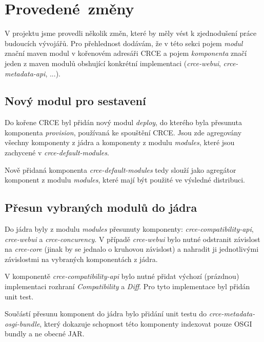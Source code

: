 \documentclass[12pt, a4paper]{article}
\begin{document}
\section{Provedené~změny} %

V projektu jsme provedli několik změn, které by měly vést k zjednodušení práce budoucích vývojářů. Pro přehlednost dodávám, že v této sekci pojem \textit{modul} znační maven modul v kořenovém adresáři CRCE a pojem \textit{komponenta} značí jeden z maven modulů obshující konkrétní implementaci (\textit{crce-webui}, \textit{crce-metadata-api}, ...).

\subsection{Nový modul pro sestavení}
Do kořene CRCE byl přidán nový modul \textit{deploy}, do kterého byla přesunuta komponenta \textit{provision}, používaná ke spouštění CRCE. Jsou zde agregovány všechny komponenty z jádra a komponenty z modulu \textit{modules}, které jsou zachycené v \textit{crce-default-modules}. 

Nově přidaná komponenta \textit{crce-default-modules} tedy slouží jako agregátor komponent z modulu \textit{modules}, které mají být použité ve výsledné distribuci.

\subsection{Přesun vybraných modulů do jádra}
Do jádra byly z modulu \textit{modules} přesunuty komponenty: \textit{crce-compatibility-api}, \textit{crce-webui} a \textit{crce-concurency}. V případě \textit{crce-webui} bylo nutné odstranit závislost na \textit{crce-core} (jinak by se jednalo o kruhovou závislost) a nahradit ji jednotlivými závislostmi na vybraných komponentách z jádra.

V komponentě \textit{crce-compatibility-api} bylo nutné přidat výchozí (prázdnou) implementaci rozhraní \textit{Compatibility} a \textit{Diff}. Pro tyto implementace byl přidán unit test.

Součástí přesunu komponent do jádra bylo přidání unit testu do \textit{crce-metadata-osgi-bundle}, který dokazuje schopnost této komponenty indexovat pouze OSGI bundly a ne obecné JAR.
\end{document}
